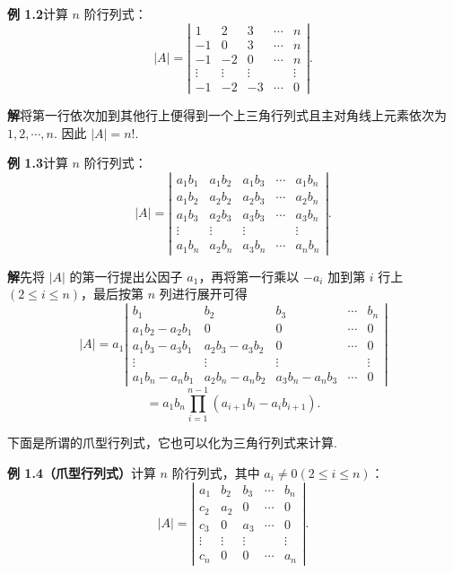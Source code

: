 \documentclass[UTF8, 12pt, fontset=fandol, oneside]{ctexart}
\begin{document}
\noindent\textbf{例 1.2}\quad 计算 $n$ 阶行列式：
\[
|A|=\left|\begin{array}{ccccc}
1 & 2 & 3 & \cdots & n\\
-1 & 0 & 3 & \cdots & n\\
-1 & -2 & 0 & \cdots & n\\
\vdots & \vdots & \vdots &        & \vdots\\
-1 & -2 & -3 & \cdots & 0
\end{array}\right|.
\]

\noindent\textbf{解}\quad 将第一行依次加到其他行上便得到一个上三角行列式且主对角线上元素依次为 $1,2,\cdots,n$. 因此 $|A|=n!$.

\noindent\textbf{例 1.3}\quad 计算 $n$ 阶行列式：
\[
|A|=\left|\begin{array}{ccccc}
a_1b_1 & a_1b_2 & a_1b_3 & \cdots & a_1b_n\\
a_1b_2 & a_2b_2 & a_2b_3 & \cdots & a_2b_n\\
a_1b_3 & a_2b_3 & a_3b_3 & \cdots & a_3b_n\\
\vdots & \vdots & \vdots &        & \vdots\\
a_1b_n & a_2b_n & a_3b_n & \cdots & a_nb_n
\end{array}\right|.
\]

\noindent\textbf{解}\quad 先将 $|A|$ 的第一行提出公因子 $a_1$，再将第一行乘以 $-a_i$ 加到第 $i$ 行上 $(2\le i\le n)$，最后按第 $n$ 列进行展开可得
\[
|A|=
a_1
\left|\begin{array}{ccccc}
b_1 & b_2 & b_3 & \cdots & b_n\\
a_1b_2-a_2b_1 & 0 & 0 & \cdots & 0\\
a_1b_3-a_3b_1 & a_2b_3-a_3b_2 & 0 & \cdots & 0\\
\vdots & \vdots & \vdots &        & \vdots\\
a_1b_n-a_nb_1 & a_2b_n-a_nb_2 & a_3b_n-a_nb_3 & \cdots & 0
\end{array}\right|
\]
\[
=a_1b_n\prod_{i=1}^{n-1}(a_{i+1}b_i-a_ib_{i+1}).
\]

下面是所谓的爪型行列式，它也可以化为三角行列式来计算.

\noindent\textbf{例 1.4（爪型行列式）}\quad 计算 $n$ 阶行列式，其中 $a_i\ne0(2\le i\le n)$：
\[
|A|=\left|\begin{array}{ccccc}
a_1 & b_2 & b_3 & \cdots & b_n\\
c_2 & a_2 & 0 & \cdots & 0\\
c_3 & 0 & a_3 & \cdots & 0\\
\vdots & \vdots & \vdots &        & \vdots\\
c_n & 0 & 0 & \cdots & a_n
\end{array}\right|.
\]
\end{document}
